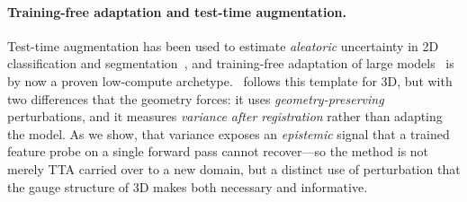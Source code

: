 \paragraph{Training-free adaptation and test-time augmentation.}
Test-time augmentation has been used to estimate \emph{aleatoric} uncertainty in 2D
classification and segmentation~\cite{ayhan,ttaaleatoric,matta}, and training-free adaptation of
large models~\cite{tda,bolt,lorattt} is by now a proven low-compute archetype. \trustr\ follows this
template for 3D, but with two differences that the geometry forces: it uses \emph{geometry-preserving}
perturbations, and it measures \emph{variance after registration} rather than adapting the model.
As we show, that variance exposes an \emph{epistemic} signal that a trained feature probe on a single
forward pass cannot recover---so the method is not merely TTA carried over to a new domain, but a
distinct use of perturbation that the gauge structure of 3D makes both necessary and informative.
